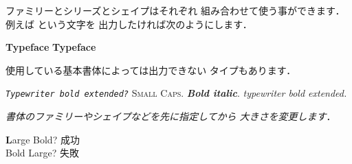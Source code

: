 {%
ファミリーとシリーズとシェイプはそれぞれ
組み合わせて使う事ができます．例えば
という文字を
出力したければ次のようにします．
\begin{InOut}
\textsf{\textbf{Typeface}}
{\sffamily\bfseries Typeface} 
\end{InOut}
使用している基本書体によっては出力できない
タイプもあります．
\begin{InOut}
\texttt{\textit{Typewriter bold 
extended?}} \textsc{Small Caps}. 
\textit{\textbf{Bold italic}}. 
{\ttfamily \itshape typewriter 
bold extended.}
\end{InOut}
\emph{書体のファミリーやシェイプなどを先に指定してから
大きさを変更します}．
\begin{InOut}
{\Large\textbf Large Bold?} 成功\\
{\textbf\Large Bold Large?} 失敗
\end{InOut}

}
